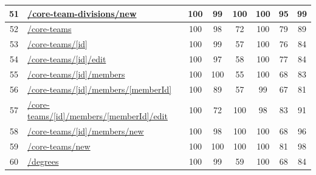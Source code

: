 \begin{longtable}{|c|p{5cm}|c|c|c|c|c|c|}
      \hline
      51                                       & \url{/core-team-divisions/new}                             & 100              & 99               & 100              & 100              & 95               & 99            \\
      \hline
      52                                       & \url{/core-teams}                                          & 100              & 98               & 72               & 100              & 79               & 89            \\
      \hline
      53                                       & \url{/core-teams/[id]}                                     & 100              & 99               & 57               & 100              & 76               & 84            \\
      \hline
      54                                       & \url{/core-teams/[id]/edit}                                & 100              & 97               & 58               & 100              & 77               & 84            \\
      \hline
      55                                       & \url{/core-teams/[id]/members}                             & 100              & 100              & 55               & 100              & 68               & 83            \\
      \hline
      56                                       & \url{/core-teams/[id]/members/[memberId]}                  & 100              & 89               & 57               & 99               & 67               & 81            \\
      \hline
      57                                       & \url{/core-teams/[id]/members/[memberId]/edit}             & 100              & 72               & 100              & 98               & 83               & 91            \\
      \hline
      58                                       & \url{/core-teams/[id]/members/new}                         & 100              & 98               & 100              & 100              & 68               & 96            \\
      \hline
      59                                       & \url{/core-teams/new}                                      & 100              & 100              & 100              & 100              & 81               & 98            \\
      \hline
      60                                       & \url{/degrees}                                             & 100              & 99               & 59               & 100              & 68               & 84            \\

\end{longtable}
